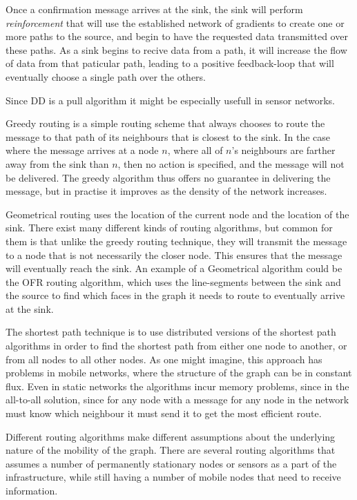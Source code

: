 \documentclass[letter, 12pt, english, draft]{article}
\begin{document}
\begin{description}
{Once a confirmation message arrives at the sink, the sink will perform \emph{reinforcement} that will use the established network of gradients to create one or more paths to the source, and begin to have the requested data transmitted over these paths. As a sink begins to recive data from a path, it will increase the flow of data from that paticular path, leading to a positive feedback-loop that will eventually choose a single path over the others.

Since DD is a pull algorithm it might be especially usefull in sensor networks. \cite{directed}
}

{Greedy routing is a simple routing scheme that always chooses to route the message to that path of its neighbours that is closest to the sink. In the case where the message arrives at a node $n$, where all of $n$'s neighbours are farther away from the sink than $n$, then no action is specified, and the message will not be delivered. The greedy algorithm thus offers no guarantee in delivering the message, but in practise it improves as the density of the network increases.}
{}

{Geometrical routing uses the location of the current node and the location of the sink. There exist many different kinds of routing algorithms, but common for them is that unlike the greedy routing technique, they will transmit the message to a node that is not necessarily the closer node. This ensures that the message will eventually reach the sink. An example of a Geometrical algorithm could be the OFR \cite{gopher} routing algorithm, which uses the line-segments between the sink and the source to find which faces in the graph it needs to route to eventually arrive at the sink.}
{}

{The shortest path technique is to use distributed versions of the shortest path algorithms in order to find the shortest path from either one node to another, or from all nodes to all other nodes. As one might imagine, this approach has problems in mobile networks, where the structure of the graph can be in constant flux. Even in static networks the algorithms incur memory problems, since in the all-to-all solution, since for any node with a message for any node in the network must know which neighbour it must send it to get the most efficient route.}
{}  

\end{description}

Different routing algorithms make different assumptions about the underlying nature of the mobility of the graph. There are several routing algorithms \cite{adaptive, two-tier} that assumes a number of permanently stationary nodes or sensors as a part of the infrastructure, while still having a number of mobile nodes that need to receive information. 
\end{document}
